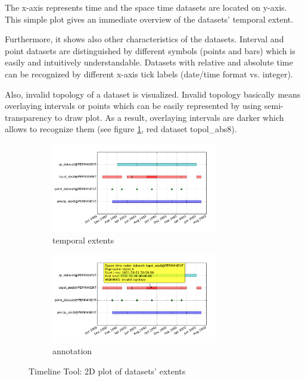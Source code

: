 \documentclass[a4paper,12pt,oneside]{book}
\begin{document}
The x-axis represents time and the space time datasets are located on y-axis.
This simple plot gives an immediate overview of the datasets' temporal extent.

Furthermore, it shows also other characteristics of the datasets.
Interval and point datasets are distinguished by different symbols (points and bars)
which is easily and intuitively understandable.
Datasets with relative and absolute time can be recognized by different x-axis tick labels (date/time format vs. integer).

Also, invalid topology of a dataset is visualized.
Invalid topology basically means overlaying intervals or points
which can be easily represented by using semi-transparency to draw plot.
As a result, overlaying intervals are darker
which allows to recognize them (see figure \ref{fig:timeline1}, red dataset topol\_abs8).

\begin{figure}[ht!]
  \centering
  \begin{subfigure}[ht]{\textwidth}
  \centering
  \includegraphics[width=0.8\textwidth]{./images/timeline1.pdf}
  \caption{temporal extents}
  \label{fig:timeline1}
  \end{subfigure}

  \begin{subfigure}[ht]{\textwidth}
  \centering
  \includegraphics[width=0.8\textwidth]{./images/timeline3.pdf}
  \caption{annotation}
  \label{fig:timeline3}
  \end{subfigure}
%   
\caption{Timeline Tool: 2D plot of datasets' extents}
\label{fig:timeline}
\end{figure}
\end{document}
